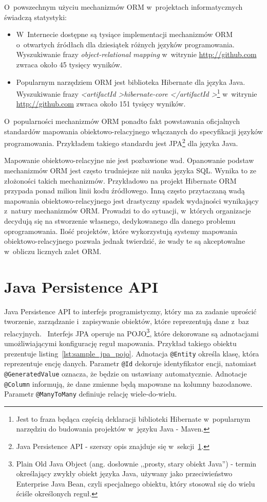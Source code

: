 O~powszechnym użyciu mechanizmów ORM w~projektach informatycznych świadczą statystyki:

\begin{itemize}
	\item W~Internecie dostępne są tysiące implementacji mechanizmów ORM o~otwartych źródłach dla dziesiątek różnych języków programowania. Wyszukiwanie frazy \emph{object-relational mapping} w~witrynie \url{http://github.com} zwraca około 45 tysięcy wyników.
	\item Popularnym narzędziem ORM jest biblioteka Hibernate dla języka Java. Wyszukiwanie frazy \emph{\textless artifactId \textgreater hibernate-core \textless /artifactId \textgreater}\footnote{Jest to fraza będąca częścią deklaracji biblioteki Hibernate w~popularnym narzędziu do budowania projektów w~języku Java - Maven.} w~witrynie \url{http://github.com} zwraca około 151 tysięcy wyników.
\end{itemize}

O~popularności mechanizmów ORM ponadto fakt powstawania oficjalnych standardów mapowania obiektowo-relacyjnego włączanych do specyfikacji języków programowania. Przykładem takiego standardu jest JPA\footnote{Java Persistence API - szerszy opis znajduje się w~sekcji~\ref{sec:jpa}.} dla języka Java.

Mapowanie obiektowo-relacyjne nie jest pozbawione wad. Opanowanie podstaw mechanizmów ORM jest często trudniejsze niż nauka języka SQL. Wynika to ze złożoności takich mechanizmów. Przykładowo na projekt Hibernate ORM przypada ponad milion linii kodu źródłowego. Inną często przytaczaną wadą mapowania obiektowo-relacyjnego jest drastyczny spadek wydajności wynikający z~natury mechanizmów ORM. Prowadzi to do sytuacji, w~których organizacje decydują się na stworzenie własnego, dedykowanego dla danego problemu oprogramowania. Ilość projektów, które wykorzystują systemy mapowania obiektowo-relacyjnego pozwala jednak twierdzić, że wady te są akceptowalne w~obliczu licznych zalet ORM.

\section{Java Persistence API}
\label{sec:jpa}

Java Persistence API to interfejs programistyczny, który ma za zadanie uprościć tworzenie, zarządzanie i~zapisywanie obiektów, które reprezentują dane z~baz relacyjnych.~\cite{jpa_documentation} Interfejs JPA operuje na POJO\footnote{Plain Old Java Object (ang. dosłownie ,,prosty, stary obiekt Java'') - termin określający zwykły obiekt języka Java, używany jako przeciwieństwo Enterprise Java Bean, czyli specjalnego obiektu, który stosował się do wielu ściśle określonych reguł.}, które dekorowane są adnotacjami umożliwiającymi konfigurację reguł mapowania. Przykład takiego obiektu prezentuje listing~\ref{lst:sample_jpa_pojo}. Adnotacja \verb+@Entity+ określa klasę, która reprezentuje encję danych. Parametr \verb+@Id+ dekoruje identyfikator encji, natomiast \verb+@GeneratedValue+ oznacza, że będzie on ustawiany automatycznie. Adnotacje \verb+@Column+ informują, że dane zmienne będą mapowane na kolumny bazodanowe. Parametr \verb+@ManyToMany+ definiuje relację wiele-do-wielu. 

